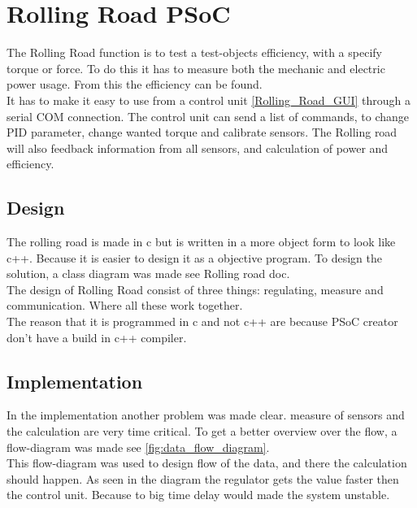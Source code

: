 \section{Rolling Road PSoC}
The Rolling Road function is to test a test-objects efficiency, with a specify torque or force. To do this it has to measure both the mechanic and electric power usage. From this the efficiency can be found.\\

It has to make it easy to use from a control unit \vref{Rolling_Road_GUI} through a serial COM connection. The control unit can send a list of commands, to change PID parameter, change wanted torque and calibrate sensors. The Rolling road will also feedback information from all sensors, and calculation of power and efficiency.\\
\subsection{Design}
The rolling road is made in c but is written in a more object form to look like c++. Because it is easier to design it as a objective program. To design the solution, a class diagram was made see Rolling road doc.\\

The design of Rolling Road consist of three things: regulating, measure and communication. Where all these work together.\\

The reason that it is programmed in c and not c++ are because PSoC creator don't have a build in c++ compiler. 
\subsection{Implementation}
In the implementation another problem was made clear. measure of sensors and the calculation are very time critical. To get a better overview over the flow, a flow-diagram was made see \vref{fig:data_flow_diagram}.\\

This flow-diagram was used to design flow of the data, and there the calculation should happen. As seen in the diagram the regulator gets the value faster then the control unit. Because to big time delay would made the system unstable.\\

